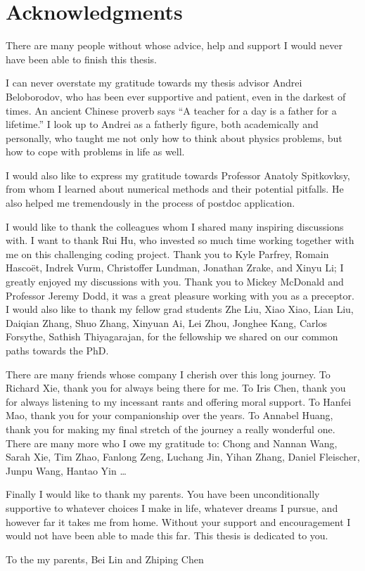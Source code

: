 \chapter*{Acknowledgments}
\label{chap:acknowledgments}

There are many people without whose advice, help and support I would never have
been able to finish this thesis.

I can never overstate my gratitude towards my thesis advisor Andrei Beloborodov,
who has been ever supportive and patient, even in the darkest of times. An
ancient Chinese proverb says ``A teacher for a day is a father for a lifetime.''
I look up to Andrei as a fatherly figure, both academically and personally, who
taught me not only how to think about physics problems, but how to cope with
problems in life as well.

I would also like to express my gratitude towards Professor Anatoly Spitkovksy,
from whom I learned about numerical methods and their potential pitfalls. He
also helped me tremendously in the process of postdoc application.

I would like to thank the colleagues whom I shared many inspiring discussions
with. I want to thank Rui Hu, who invested so much time working together with me
on this challenging coding project. Thank you to Kyle Parfrey, Romain Hascoët,
Indrek Vurm, Christoffer Lundman, Jonathan Zrake, and Xinyu Li; I greatly
enjoyed my discussions with you. Thank you to Mickey McDonald and Professor
Jeremy Dodd, it was a great pleasure working with you as a preceptor. I would
also like to thank my fellow grad students Zhe Liu, Xiao Xiao, Lian Liu, Daiqian
Zhang, Shuo Zhang, Xinyuan Ai, Lei Zhou, Jonghee Kang, Carlos Forsythe, Sathish
Thiyagarajan, for the fellowship we shared on our common paths towards the PhD.

There are many friends whose company I cherish over this long journey. To
Richard Xie, thank you for always being there for me. To Iris Chen, thank you
for always listening to my incessant rants and offering moral support. To Hanfei
Mao, thank you for your companionship over the years. To Annabel Huang, thank
you for making my final stretch of the journey a really wonderful one. There are
many more who I owe my gratitude to: Chong and Nannan Wang, Sarah Xie, Tim Zhao,
Fanlong Zeng, Luchang Jin, Yihan Zhang, Daniel Fleischer, Junpu Wang, Hantao Yin
\dots

Finally I would like to thank my parents. You have
been unconditionally supportive to whatever choices I make in life, whatever
dreams I pursue, and however far it takes me from home. Without your support and
encouragement I would not have been able to made this far. This thesis is
dedicated to you.

\newpage \vspace*{8cm}
\begin{center}
\large To the my parents, Bei Lin and Zhiping Chen
\end{center}
